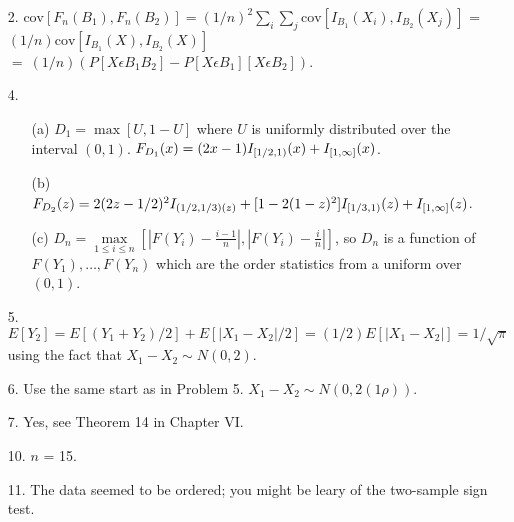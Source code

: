 \begin{enumerate}
	\item[2.]  $\mbox{cov}[F_n(B_1),F_n(B_2)] = (1/n)^2\sum\limits_{i}\sum\limits_{j}\mbox{cov}[I_{B_1}(X_i), I_{B_2}(X_j)]$ = $(1/n)\mbox{cov}[I_{B_1}(X), I_{B_2}(X)]$ \\ $=\ (1/n)(P[X\epsilon B_1B_2] - P[X\epsilon B_1][X\epsilon B_2])$.
	
	\item[4.] \begin{enumerate}
		\item[(a)] $D_1 = \max[U, 1-U]$ where $U$ is uniformly distributed over the interval $(0,1)$. $F_{D_1}(x) = (2x-1)I_{[{\small 1/2},1)}(x) + I_{[1,\infty]}(x)$.
		\item[(b)] $F_{D_2}(z) = 2(2z-{\small 1/2})^2I_{({\small 1/2,1/3})(z)} + [1-2(1-z)^2]I_{[{\small 1/3, 1})}(z) + I_{[1,\infty]}(z)$.
		\item[(c)] $D_n = \max\limits_{1\le i\le n} [\left\vert F(Y_i) - \frac{i-1}{n}\right\vert, \left\vert F(Y_i) - \frac{i}{n}\right\vert]$, so $D_n$ is a function of $F(Y_1), \ldots, F(Y_n)$ which are the order statistics from a uniform over $(0,1)$.
	\end{enumerate}
	
	\item[5.] $E[Y_2] = E[(Y_1+Y_2)/2] + E[\left\vert X_1-X_2\right\vert/2] = (1/2)E[\left\vert X_1-X_2\right\vert] = 1/\sqrt{\pi}$ using the fact that $X_1-X_2\sim N(0,2)$.
	
	\item[6.] Use the same start as in Problem 5.  $X_1-X_2 \sim N(0,2(1\rho))$.
	
	\item[7.] Yes, see Theorem 14 in Chapter VI.
	
	\item[10.] $n$ = 15.
	
	\item[11.] The data seemed to be ordered; you might be leary of the two-sample sign test.
	

\end{enumerate}
